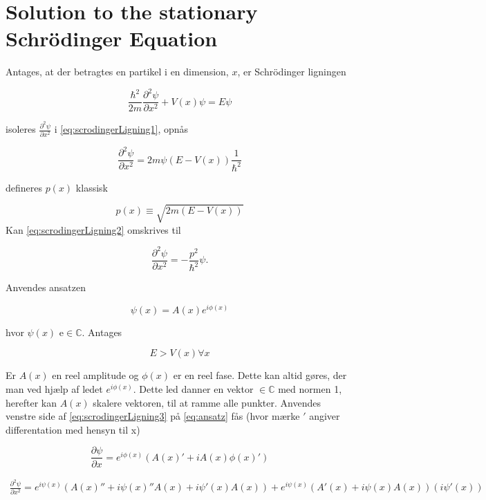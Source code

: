 \section{Solution to the stationary Schrödinger Equation}

Antages, at der betragtes en partikel i en dimension, $x$,  er Schrödinger ligningen

\begin{equation}
    \frac{\hbar^2}{2m}\frac{\partial^2 \psi}{\partial x^2} + V(x) \psi = E \psi
    \label{eq:scrodingerLigning1}
\end{equation}

isoleres $\frac{\partial^2 \psi}{\partial x^2}$ i \cref{eq:scrodingerLigning1}, opnås

\begin{equation}
    \frac{\partial^2 \psi}{\partial x^2} = 2m\psi (E  - V(x)) \frac{1}{\hbar^2}
    \label{eq:scrodingerLigning2}
\end{equation}

defineres $p(x)$ klassisk

\begin{equation}
p(x) \equiv \sqrt{2m(E-V(x))}
\end{equation}
Kan \cref{eq:scrodingerLigning2} omskrives til

\begin{equation}
    \frac{\partial^2 \psi}{\partial x^2} = - \frac{p^2}{\hbar^2} \psi.
    \label{eq:scrodingerLigning3}
\end{equation}

Anvendes ansatzen

\begin{equation}
    \psi(x) = A(x) e^{i \phi(x)}
    \label{eq:ansatz}
\end{equation}

hvor $\psi (x)$ e$ \in \mathbb{C}$. Antages

\begin{equation}
 E > V(x) \forall x
\end{equation}

Er $A(x)$ en reel amplitude og $\phi(x)$ er en reel fase. Dette kan altid gøres, der man ved hjælp af ledet  $e^{i \phi(x)} $. Dette led danner en vektor $ \in \mathbb{C}$ med normen 1, herefter kan $A(x)$  skalere vektoren, til at ramme alle punkter. Anvendes venstre side af \cref{eq:scrodingerLigning3} på \cref{eq:ansatz} fås (hvor mærke $'$ angiver differentation med hensyn til x)

\begin{equation}
    \frac{\partial \psi}{\partial x} = e^{i \phi(x)}(A(x)' + iA(x) \phi(x) ')
    \label{eq:diff1gange}
\end{equation}

\begin{align}
    \frac{\partial^2 \psi}{\partial x^2} = e^{i \psi(x)} (A(x)'' +
    i \psi(x)''A(x)+i\psi'(x)A(x)) + 
     e^{i \psi(x)}(A'(x)+i \psi(x)A(x)) (i \psi'(x))
    \label{eq:diff2gange}
\end{align}
